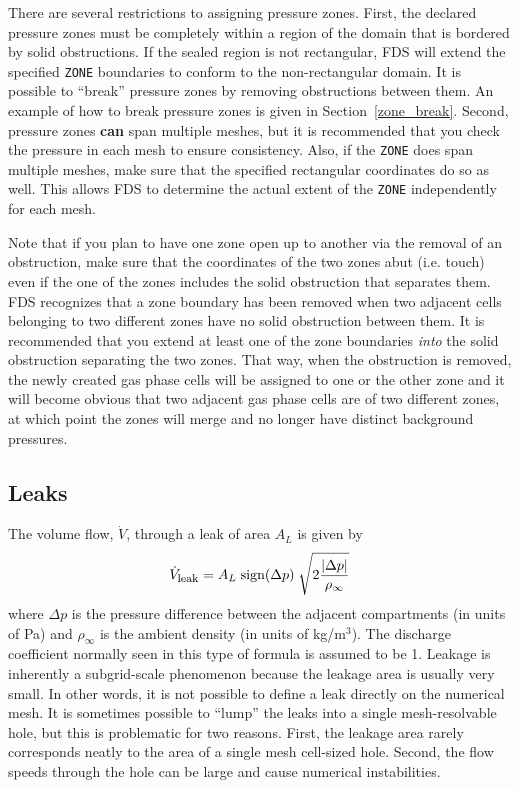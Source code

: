 \documentclass[11pt]{book}
\newcommand{\ct}{\tt\small}
\newcommand{\be}{\begin{equation}}
\newcommand{\ee}{\end{equation}}
\begin{document}
There are several restrictions to assigning pressure zones. First, the declared pressure zones must be completely within a region of the
domain that is bordered by solid obstructions. If the sealed region is not rectangular, FDS will extend the specified {\ct ZONE} boundaries to
conform to the non-rectangular domain. It is possible to ``break'' pressure zones by removing
obstructions between them. An example of how to break pressure zones is given in Section~\ref{zone_break}.
Second, pressure zones {\bf can} span multiple meshes, but it is recommended that you check the pressure in each mesh to ensure consistency. Also, if the {\ct ZONE} does span multiple
meshes, make sure that the specified rectangular coordinates do so as well. This allows FDS to determine the actual extent of the {\ct ZONE} independently for each
mesh.

Note that if you plan to have one zone open up to another via the removal of an obstruction, make sure that the coordinates of the two
zones abut (i.e. touch) even if the one of the zones includes the solid obstruction that separates them. FDS recognizes that a zone boundary has been removed when
two adjacent cells belonging to two different zones have no solid obstruction between them. It is recommended that you extend at least one
of the zone boundaries {\em into} the solid obstruction separating the two zones. That way, when the obstruction is removed, the newly created
gas phase cells will be assigned to one or the other zone and it will become obvious that two adjacent gas phase cells are of two different zones, at
which point the zones will merge and no longer have distinct background pressures.


\subsection{Leaks}
\label{info:Leaks}

The volume flow, $\dot{V}$, through a leak of area $A_L$ is given by
\be  \dot{V}_{\hbox{\footnotesize leak}} = A_L \; \hbox{sign} (\Delta p) \; \sqrt{2 \frac{ | \Delta p |}{\rho_\infty}} \ee
where $\Delta p$ is the pressure difference between the adjacent compartments (in units of Pa) and
$\rho_\infty$ is the ambient density (in units of kg/m$^3$). The discharge coefficient normally seen in this type of formula is assumed
to be 1. Leakage is inherently a subgrid-scale phenomenon because the leakage area is usually very small. In other words, it is not possible to define a leak directly on the
numerical mesh. It is sometimes possible to ``lump'' the leaks into a single mesh-resolvable hole, but this is problematic
for two reasons. First, the leakage area rarely corresponds neatly to the area of a single mesh cell-sized hole. Second, the
flow speeds through the hole can be large and cause numerical instabilities.
\end{document}
